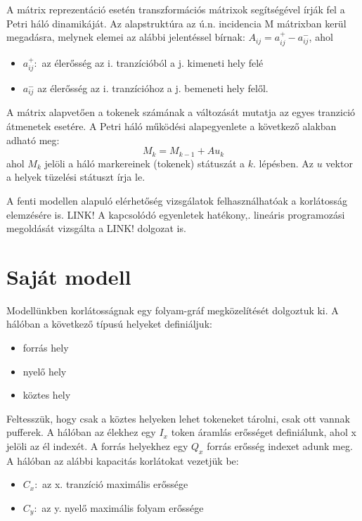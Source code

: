 \documentclass[12pt,a4paper]{book}
\begin{document}
A mátrix reprezentáció esetén transzformációs mátrixok segítségével írják fel a Petri háló dinamikáját. Az alapstruktúra az ú.n. incidencia M mátrixban kerül megadásra, melynek elemei az alábbi jelentéssel bírnak: $A_{ij}=a^+_{ij}-a^-_{ij}$, ahol 
\begin{itemize}
\item $a^+_{ij}: $ az élerősség az i. tranzícióból a j. kimeneti hely felé
\item $a^-_{ij}$ az élerősség az i. tranzícióhoz a j. bemeneti hely felől.
\end{itemize}

A mátrix alapvetően a tokenek számának a változását mutatja az egyes tranzició átmenetek esetére. A  Petri háló működési alapegyenlete a következő alakban adható meg: 
$$M_k=M_{k-1}+ Au_k$$
ahol $M_k$ jelöli a háló markereinek (tokenek) státuszát a $k.$ lépésben. Az $u$ vektor a helyek tüzelési státuszt írja le. 

A fenti modellen alapuló elérhetőség vizsgálatok felhasználhatóak a korlátosság elemzésére is. LINK!%
A kapcsolódó  egyenletek hatékony,. lineáris programozási megoldását vizsgálta a LINK!  
dolgozat is.


\section{Saját modell}

Modellünkben korlátosságnak egy folyam-gráf megközelítését dolgoztuk ki.  A hálóban a következő típusú helyeket definiáljuk:
\begin{itemize}
\item forrás hely
\item nyelő hely
\item köztes hely
\end{itemize}
Feltesszük, hogy csak a köztes helyeken lehet tokeneket tárolni, csak ott vannak pufferek. A hálóban az élekhez egy $I_x$ token áramlás erősséget definiálunk, ahol x jelöli az él indexét. A forrás helyekhez egy $Q_x$ forrás erősség indexet adunk meg. A hálóban az alábbi kapacitás korlátokat vezetjük be:
\begin{itemize}
\item $C_x:$ az x. tranzíció maximális erőssége 
\item $C_y:$ az y. nyelő maximális folyam erőssége 
\end{itemize}
\end{document}
